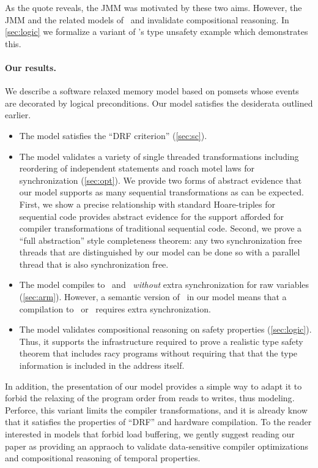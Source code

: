 As the quote reveals, the JMM\citet{Manson:2005:JMM:1047659.1040336} was motivated by these two aims.  However, the JMM and the related models of~\citet{DBLP:conf/esop/JagadeesanPR10} and \citet{DBLP:conf/popl/KangHLVD17} invalidate compositional reasoning.  In \textsection\ref{sec:logic} we formalize a variant of \citeauthor{DBLP:journals/toplas/Lochbihler13}'s type unsafety example which demonstrates this.  

\paragraph{Our results. } We describe a software relaxed memory model based on pomsets whose events are decorated by logical  preconditions.   Our model satisfies the desiderata outlined earlier.

\begin{itemize}
\item The model satisfies the ``DRF criterion''  (\textsection\ref{sec:sc}).

\item The model validates a variety of single threaded transformations including reordering of independent statements and roach motel laws for synchronization  (\textsection\ref{sec:opt}).
%
We provide two forms of abstract evidence that our model supports as many sequential transformations as can be expected.  First, we show a precise relationship with standard Hoare-triples for sequential code provides abstract evidence for the support afforded for compiler  transformations of traditional sequential code.  Second, we prove a ``full abstraction'' style completeness  theorem: any two synchronization free threads that are distinguished by our model can be done so with a parallel thread that is also synchronization free. 

\item The model compiles to \armeight\ and \tso\ {\em without} extra synchronization for raw variables  (\textsection\ref{sec:arm}).
However, a semantic version of \mca\ in our model means that a compilation to \armseven\ or \ppc\ requires extra synchronization.  

\item The model validates compositional reasoning on safety properties (\textsection\ref{sec:logic}).  Thus, it supports the infrastructure required to prove a realistic type safety theorem that includes racy programs without requiring that that the type information is included in the address itself.
\end{itemize}
In addition, the presentation of our model provides a simple way to adapt it to forbid the relaxing of the program order from reads to writes, thus modeling\cite{Dolan:2018:BDR:3192366.3192421,BoehmOOTA}.  Perforce, this variant limits the compiler transformations, and it is already know that it satisfies the properties of ``DRF'' and hardware compilation.   To the reader interested in models that forbid load buffering, we gently suggest reading our paper as providing an appraoch to validate data-sensitive compiler optimizations and compositional reasoning of temporal properties.   


